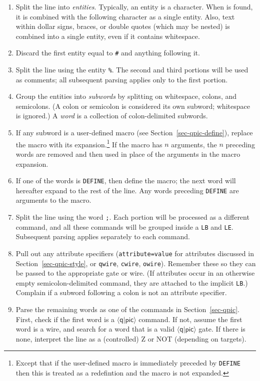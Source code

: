 \documentclass[twoside,12pt]{article}
\newcommand{\qpic}{$\langle\mathsf{q}|\mathsf{pic}\rangle$\xspace}
\begin{document}
\begin{enumerate}
\item Split the line into \emph{entities}.  Typically, an entity is a character.  When {\tt {}} is found, it
is combined with the following character as a single entity.  Also, text within dollar signs, braces, or double quotes (which
may be nested) is combined into a single entity, even if it contains whitespace.
\item Discard the first entity equal to {\tt \#} and anything following it.
\item Split the line using the entity {\tt \%}.  The second and third portions will be used as comments;
  all subsequent parsing applies only to the first portion.
\item Group the entities into \emph{subwords} by splitting on whitespace,
  colons, and semicolons.  (A colon or semicolon is considered its own
  subword; whitespace is ignored.)  A \emph{word} is a collection of
  colon-delimited subwords.
\item If any subword is a user-defined macro (see Section~\ref{sec-qpic-define}), replace the macro with its expansion.\footnote{Except that if the
  user-defined macro is immediately preceded by {\tt DEFINE} then this is
  treated as a redefintion and the macro is not expanded.}  If the macro
  has $n$ arguments, the $n$ preceding words are removed and then used
  in place of the arguments in the macro expansion.
\item If one of the words is {\tt DEFINE}, then define the macro; the next word
  will hereafter expand to the rest of the line.  Any words preceding
  {\tt DEFINE} are arguments to the macro.
\item Split the line using the word {\tt ;}.  Each portion will be processed
  as a different command, and all these commands will be grouped inside a
  {\tt LB} and {\tt LE}.  Subsequent parsing applies separately to each command.
\item Pull out any attribute specifiers ({\tt attribute=value} for attributes
  discussed in Section~\ref{sec-qpic-style}, or {\tt qwire}, {\tt cwire},
  {\tt owire}).  Remember these so they can be passed to the appropriate
  gate or wire.  (If attributes occur in an otherwise empty semicolon-delimited
  command, they are attached to the implicit {\tt LB}.)  Complain if a subword
  following a colon is not an attribute specifier.
\item Parse the remaining words as one of the commands in
  Section~\ref{sec-qpic}.  First, check if the first word is a \qpic command.
  If not, assume the first word is a wire, and search for a word that is a
  valid \qpic gate.  If there is none, interpret the line as a (controlled) Z
  or NOT (depending on targets).
\end{enumerate} 




\end{document}
